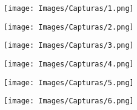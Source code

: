 \texttt{[image: Images/Capturas/1.png]}

\texttt{[image: Images/Capturas/2.png]}

\texttt{[image: Images/Capturas/3.png]}

\texttt{[image: Images/Capturas/4.png]}

\texttt{[image: Images/Capturas/5.png]}

\texttt{[image: Images/Capturas/6.png]}